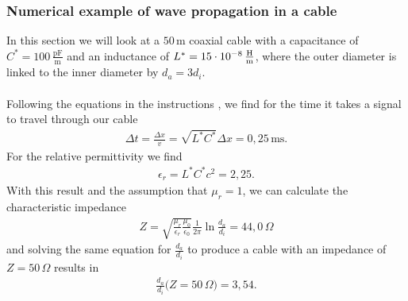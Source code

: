 \documentclass[a4paper,10pt,twocolumn]{article}
\begin{document}
    \subsubsection{Numerical example of wave propagation in a cable}
    In this section we will look at a $50\,\si{\m}$ coaxial cable with a capacitance of $C^*=100\,\frac{\si{\pF}}{\si{\m}}$ and an inductance of $L^*=15\cdot 10^{-8}\,\frac{\si{\H}}{\si{\m}}$, where the outer diameter is linked to the inner diameter by $d_a=3d_i$.
    \\\\Following the equations in the instructions \cite{instr}, we find for the time it takes a signal to travel through our cable
    \begin{align*}
        \Delta t=\frac{\Delta x}{v}=\sqrt{L^*C^*}\Delta x = 0,25\,\si{\ms}.
    \end{align*}
    For the relative permittivity we find
    \begin{align*}
        \epsilon_r=L^*C^*c^2= 2,25.
    \end{align*}
    With this result and the assumption that $\mu_r=1$, we can calculate the characteristic impedance
    \begin{align*}
        Z=\sqrt{\frac{\mu_r}{\epsilon_r}\frac{\mu_0}{\epsilon_0}}\frac{1}{2\pi}\ln{\frac{d_a}{d_i}}=44,0\,\si{\Omega}
    \end{align*}
    and solving the same equation for $\frac{d_a}{d_i}$ to produce a cable with an impedance of $Z=50\,\si{\Omega}$ results in
    \begin{align*}
        \frac{d_a}{d_i}\big( Z=50\,\si{\Omega} \big ) = 3,54.
    \end{align*}
\end{document}
